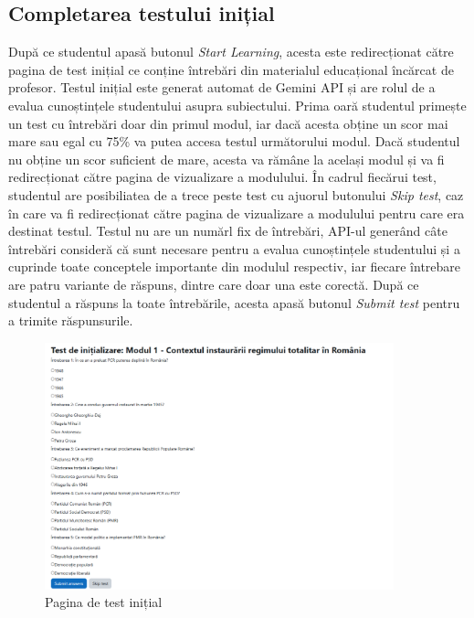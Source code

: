 \subsection{Completarea testului inițial}
După ce studentul apasă butonul \textit{Start Learning}, acesta este redirecționat către pagina de test inițial ce conține întrebări din materialul educațional încărcat de profesor.
Testul inițial este generat automat de Gemini API și are rolul de a evalua cunoștințele studentului asupra subiectului. Prima oară studentul primește un test cu întrebări doar din primul 
modul, iar dacă acesta obține un scor mai mare sau egal cu 75\% va putea accesa testul următorului modul. Dacă studentul nu obține un scor suficient de mare, acesta va rămâne
la același modul și va fi redirecționat către pagina de vizualizare a modulului. În cadrul fiecărui test, studentul are posibiliatea de a trece peste test cu ajuorul butonului 
\textit{Skip test}, caz în care va fi redirecționat către pagina de vizualizare a modulului pentru care era destinat testul. Testul nu are un numărl fix de întrebări, API-ul generând
câte întrebări consideră că sunt necesare pentru a evalua cunoștințele studentului și a cuprinde toate conceptele importante din modulul respectiv, iar fiecare întrebare are patru variante 
de răspuns, dintre care doar una este corectă. După ce studentul a răspuns la toate întrebările, acesta apasă butonul \textit{Submit test} pentru a trimite răspunsurile.
\begin{figure}[H]
    \centering
    \includegraphics[width=0.9\textwidth]{images/testInit.png}
    \caption{Pagina de test inițial}
    \label{fig:pagina_test_initial}
\end{figure}


